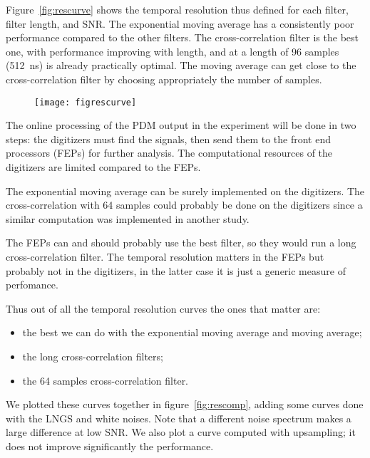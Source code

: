 Figure~\ref{fig:rescurve} shows the temporal resolution thus defined for each
filter, filter length, and SNR. The exponential moving average has a
consistently poor performance compared to the other filters. The
cross-correlation filter is the best one, with performance improving with
length, and at a length of 96 samples (\SI{512}{ns}) is already practically
optimal. The moving average can get close to the cross-correlation filter by
choosing appropriately the number of samples.

\begin{figure}
    \hspace{-0.09\textwidth}
    \texttt{[image: figrescurve]}
    

\end{figure}

The online processing of the PDM output in the experiment will be done in two
steps: the digitizers must find the signals, then send them to the front end
processors (FEPs) for further analysis. The computational resources of the
digitizers are limited compared to the FEPs.


The exponential moving average can be surely implemented on the digitizers. The
cross-correlation with 64 samples could probably be done on the digitizers
since a similar computation was implemented in another study.

The FEPs can and should probably use the best filter, so they would run a long
cross-correlation filter. The temporal resolution matters in the FEPs but
probably not in the digitizers, in the latter case it is just a generic measure
of perfomance.

Thus out of all the temporal resolution curves the ones that matter are:
%
\begin{itemize}
    \item the best we can do with the exponential moving average and moving
    average;
    \item the long cross-correlation filters;
    \item the 64 samples cross-correlation filter.
\end{itemize}
%
We plotted these curves together in figure~\ref{fig:rescomp}, adding some
curves done with the LNGS and white noises. Note that a different noise
spectrum makes a large difference at low SNR. We also plot a curve computed
with upsampling; it does not improve significantly the performance.

